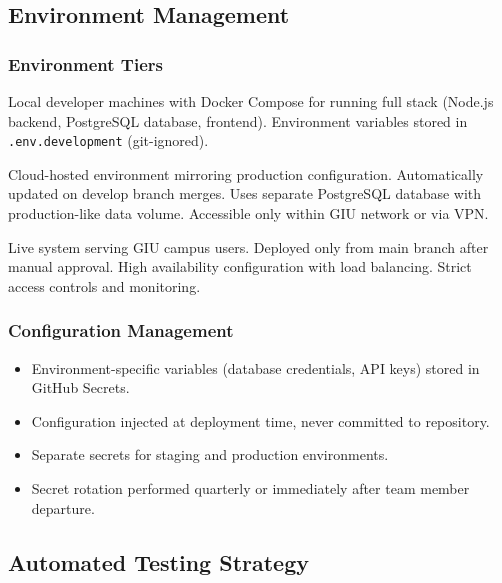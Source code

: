 \documentclass[12pt,a4paper]{article}
\begin{document}
\subsection{Environment Management}

\subsubsection{Environment Tiers}

\begin{description}[leftmargin=2em, itemsep=8pt, style=nextline]
    \item[\textbf{Development Environment:}] Local developer machines with Docker Compose for running full stack (Node.js backend, PostgreSQL database, frontend). Environment variables stored in \texttt{.env.development} (git-ignored).
    
    \item[\textbf{Staging Environment:}] Cloud-hosted environment mirroring production configuration. Automatically updated on develop branch merges. Uses separate PostgreSQL database with production-like data volume. Accessible only within GIU network or via VPN.
    
    \item[\textbf{Production Environment:}] Live system serving GIU campus users. Deployed only from main branch after manual approval. High availability configuration with load balancing. Strict access controls and monitoring.
\end{description}

\subsubsection{Configuration Management}

\begin{itemize}[leftmargin=2em, itemsep=6pt]
    \item Environment-specific variables (database credentials, API keys) stored in GitHub Secrets.
    \item Configuration injected at deployment time, never committed to repository.
    \item Separate secrets for staging and production environments.
    \item Secret rotation performed quarterly or immediately after team member departure.
\end{itemize}

\subsection{Automated Testing Strategy}
\end{document}
